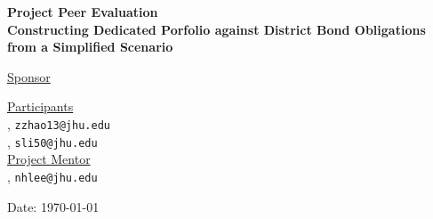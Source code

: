 \documentclass[12pt,letterpaper]{article}
\theoremstyle{definition}
\begin{document}
\def\shiftdowna{0.32in}  %
\def\shiftdownb{0.22in}  %


\begin{center}
\textbf{{\large Project Peer Evaluation}}\\


\vspace \shiftdowna
\textbf{{\large Constructing Dedicated Porfolio against District Bond Obligations from a Simplified Scenario}}

\vspace\shiftdownb
\underline{Sponsor}\\
\vspace{5pt}

\vspace \shiftdownb
\underline {Participants} \\
\vspace{5pt}
, \texttt{zzhao13@jhu.edu}\\
, \texttt{sli50@jhu.edu}\\
\vspace \shiftdownb
\underline {Project Mentor}\\
\vspace{5pt}
, \texttt{nhlee@jhu.edu}

\vspace{.50in}
\vspace \shiftdowna
Date: \today

\end{center}


\newpage
\end{document}
